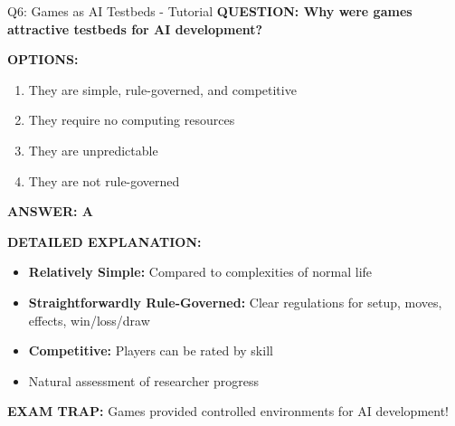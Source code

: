 \documentclass[8pt]{beamer}
\begin{document}
	\begin{frame}{Q6: Games as AI Testbeds - Tutorial}
		\fontsize{6.5}{7.5}\selectfont
		\textbf{QUESTION: Why were games attractive testbeds for AI development?}
		
		\vspace{0.1cm}
		\textbf{OPTIONS:}
		\begin{enumerate}
			\item They are simple, rule-governed, and competitive
			\item They require no computing resources
			\item They are unpredictable
			\item They are not rule-governed
		\end{enumerate}
		
		\vspace{0.1cm}
		\textcolor{myblue}{\textbf{ANSWER: A}}
		
		\vspace{0.1cm}
		\textbf{DETAILED EXPLANATION:}
		\begin{itemize}
			\item \textbf{Relatively Simple:} Compared to complexities of normal life
			\item \textbf{Straightforwardly Rule-Governed:} Clear regulations for setup, moves, effects, win/loss/draw
			\item \textbf{Competitive:} Players can be rated by skill
			\item Natural assessment of researcher progress
		\end{itemize}
		
		\vspace{0.1cm}
		\textcolor{myred}{\textbf{EXAM TRAP:}} Games provided \textcolor{myblue}{controlled environments} for AI development!
	\end{frame}
	
\end{document}
